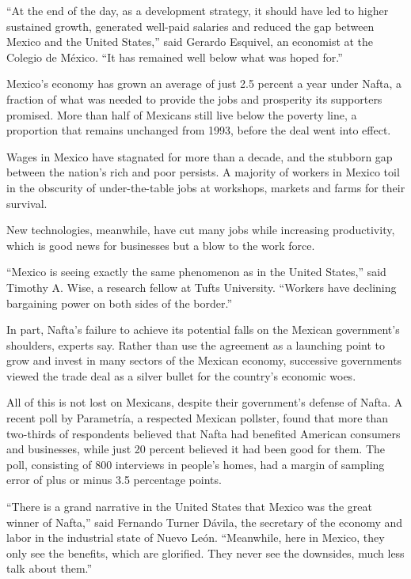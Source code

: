 ``At the end of the day, as a development strategy, it should have led
to higher sustained growth, generated well-paid salaries and reduced the
gap between Mexico and the United States,'' said Gerardo Esquivel, an
economist at the Colegio de México. ``It has remained well below what
was hoped for.''

Mexico's economy has grown an average of just 2.5 percent a year under
Nafta, a fraction of what was needed to provide the jobs and prosperity
its supporters promised. More than half of Mexicans still live below the
poverty line, a proportion that remains unchanged from 1993, before the
deal went into effect.

Wages in Mexico have stagnated for more than a decade, and the stubborn
gap between the nation's rich and poor persists. A majority of workers
in Mexico toil in the obscurity of under-the-table jobs at workshops,
markets and farms for their survival.

New technologies, meanwhile, have cut many jobs while increasing
productivity, which is good news for businesses but a blow to the work
force.

``Mexico is seeing exactly the same phenomenon as in the United
States,'' said Timothy A. Wise, a research fellow at Tufts University.
``Workers have declining bargaining power on both sides of the border.''

In part, Nafta's failure to achieve its potential falls on the Mexican
government's shoulders, experts say. Rather than use the agreement as a
launching point to grow and invest in many sectors of the Mexican
economy, successive governments viewed the trade deal as a silver bullet
for the country's economic woes.

All of this is not lost on Mexicans, despite their government's defense
of Nafta. A recent poll by Parametría, a respected Mexican pollster,
found that more than two-thirds of respondents believed that Nafta had
benefited American consumers and businesses, while just 20 percent
believed it had been good for them. The poll, consisting of 800
interviews in people's homes, had a margin of sampling error of plus or
minus 3.5 percentage points.

``There is a grand narrative in the United States that Mexico was the
great winner of Nafta,'' said Fernando Turner Dávila, the secretary of
the economy and labor in the industrial state of Nuevo León.
``Meanwhile, here in Mexico, they only see the benefits, which are
glorified. They never see the downsides, much less talk about them.''

